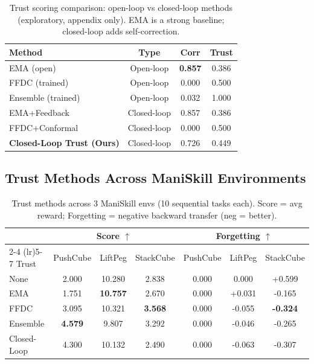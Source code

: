 \documentclass{article}
\begin{document}
\begin{table}[h]
\centering
\caption{Trust scoring comparison: open-loop vs closed-loop methods (exploratory, appendix only). EMA is a strong baseline; closed-loop adds self-correction.}
\label{tab:trust_comparison}
\begin{tabular}{lccc}
\toprule
Method & Type & Corr & Trust \\
\midrule
EMA (open) & Open-loop & \textbf{0.857} & 0.386 \\
FFDC (trained) & Open-loop & 0.000 & 0.500 \\
Ensemble (trained) & Open-loop & 0.032 & 1.000 \\
\midrule
EMA+Feedback & Closed-loop & 0.857 & 0.386 \\
FFDC+Conformal & Closed-loop & 0.000 & 0.500 \\
\textbf{Closed-Loop Trust (Ours)} & Closed-loop & 0.726 & 0.449 \\
\bottomrule
\end{tabular}
\end{table}

\subsection{Trust Methods Across ManiSkill Environments}

\begin{table}[h]
\centering
\caption{Trust methods across 3 ManiSkill envs (10 sequential tasks each). Score = avg reward; Forgetting = negative backward transfer (neg = better).}
\label{tab:wam_trust}
\small
\begin{tabular}{lcccccc}
\toprule
 & \multicolumn{3}{c}{Score $\uparrow$} & \multicolumn{3}{c}{Forgetting $\uparrow$} \\
\cmidrule(lr){2-4} \cmidrule(lr){5-7}
Trust & PushCube & LiftPeg & StackCube & PushCube & LiftPeg & StackCube \\
\midrule
None & 2.000 & 10.280 & 2.838 & 0.000 & 0.000 & +0.599 \\
EMA & 1.751 & \textbf{10.757} & 2.670 & 0.000 & +0.031 & -0.165 \\
FFDC & 3.095 & 10.321 & \textbf{3.568} & 0.000 & -0.055 & \textbf{-0.324} \\
Ensemble & \textbf{4.579} & 9.807 & 3.292 & 0.000 & -0.046 & -0.265 \\
Closed-Loop & 4.300 & 10.132 & 2.490 & 0.000 & -0.063 & -0.307 \\
\bottomrule
\end{tabular}
\end{table}
\end{document}
